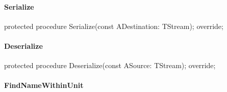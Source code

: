 \documentclass{report}
\newif\ifpdf
\begin{document}
\paragraph*{Serialize}\hspace*{\fill}

\label{PasDoc_Items.TPasItem-Serialize}
\begin{list}{}{
\setlength{\itemindent}{0cm}
\setlength{\listparindent}{0cm}
\setlength{\leftmargin}{\evensidemargin}
\addtolength{\leftmargin}{\tmplength}
\settowidth{\labelsep}{X}
\addtolength{\leftmargin}{\labelsep}
\setlength{\labelwidth}{\tmplength}
}
\item[\textbf{Declaration}\hfill]
\ifpdf
\begin{flushleft}
\fi
\begin{ttfamily}
protected procedure Serialize(const ADestination: TStream); override;\end{ttfamily}

\ifpdf
\end{flushleft}
\fi

\end{list}
\paragraph*{Deserialize}\hspace*{\fill}

\label{PasDoc_Items.TPasItem-Deserialize}
\begin{list}{}{
\setlength{\itemindent}{0cm}
\setlength{\listparindent}{0cm}
\setlength{\leftmargin}{\evensidemargin}
\addtolength{\leftmargin}{\tmplength}
\settowidth{\labelsep}{X}
\addtolength{\leftmargin}{\labelsep}
\setlength{\labelwidth}{\tmplength}
}
\item[\textbf{Declaration}\hfill]
\ifpdf
\begin{flushleft}
\fi
\begin{ttfamily}
protected procedure Deserialize(const ASource: TStream); override;\end{ttfamily}

\ifpdf
\end{flushleft}
\fi

\end{list}
\paragraph*{FindNameWithinUnit}\hspace*{\fill}
\end{document}
